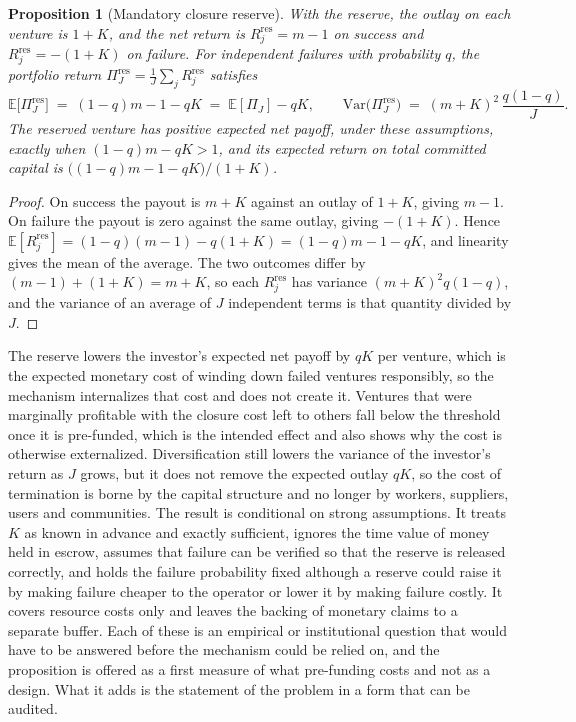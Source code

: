 \documentclass[11pt]{article}
\newtheorem{proposition}{Proposition}
\theoremstyle{remark}
\newcommand{\E}{\mathbb{E}}
\newcommand{\Var}{\mathrm{Var}}
\begin{document}
\begin{proposition}[Mandatory closure reserve]\label{prop:reserve}
With the reserve, the outlay on each venture is $1+K$, and the net return is $R^{\mathrm{res}}_j=m-1$ on success and $R^{\mathrm{res}}_j=-(1+K)$ on failure. For independent failures with probability $q$, the portfolio return $\Pi^{\mathrm{res}}_J=\tfrac1J\sum_j R^{\mathrm{res}}_j$ satisfies
\[
\E\bigl[\Pi^{\mathrm{res}}_J\bigr]\;=\;(1-q)m-1-qK\;=\;\E[\Pi_J]-qK,
\qquad
\Var\bigl(\Pi^{\mathrm{res}}_J\bigr)\;=\;(m+K)^2\,\frac{q(1-q)}{J}.
\]
The reserved venture has positive expected net payoff, under these assumptions, exactly when $(1-q)m-qK>1$, and its expected return on total committed capital is $\bigl((1-q)m-1-qK\bigr)/(1+K)$.
\end{proposition}

\begin{proof}
On success the payout is $m+K$ against an outlay of $1+K$, giving $m-1$. On failure the payout is zero against the same outlay, giving $-(1+K)$. Hence $\E[R^{\mathrm{res}}_j]=(1-q)(m-1)-q(1+K)=(1-q)m-1-qK$, and linearity gives the mean of the average. The two outcomes differ by $(m-1)+(1+K)=m+K$, so each $R^{\mathrm{res}}_j$ has variance $(m+K)^2q(1-q)$, and the variance of an average of $J$ independent terms is that quantity divided by $J$.
\end{proof}

The reserve lowers the investor's expected net payoff by $qK$ per venture, which is the expected monetary cost of winding down failed ventures responsibly, so the mechanism internalizes that cost and does not create it. Ventures that were marginally profitable with the closure cost left to others fall below the threshold once it is pre-funded, which is the intended effect and also shows why the cost is otherwise externalized. Diversification still lowers the variance of the investor's return as $J$ grows, but it does not remove the expected outlay $qK$, so the cost of termination is borne by the capital structure and no longer by workers, suppliers, users and communities. The result is conditional on strong assumptions. It treats $K$ as known in advance and exactly sufficient, ignores the time value of money held in escrow, assumes that failure can be verified so that the reserve is released correctly, and holds the failure probability fixed although a reserve could raise it by making failure cheaper to the operator or lower it by making failure costly. It covers resource costs only and leaves the backing of monetary claims to a separate buffer. Each of these is an empirical or institutional question that would have to be answered before the mechanism could be relied on, and the proposition is offered as a first measure of what pre-funding costs and not as a design. What it adds is the statement of the problem in a form that can be audited.
\end{document}
